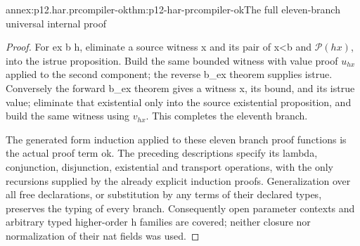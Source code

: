 \begin{annexitem}{annex:p12.har.prcompiler-ok}{thm:p12-har-prcompiler-ok}{The full eleven-branch universal internal proof}
\begin{proof}
For ex b h, eliminate a source witness x and its pair of x<b and
\(\mathcal P(h x)\), into the istrue proposition. Build the same
bounded witness with value proof \(u_{h x}\) applied to the second
component; the reverse b\_ex theorem supplies istrue. Conversely
the forward b\_ex theorem gives a witness x, its bound, and its
istrue value; eliminate that existential only into the source
existential proposition, and build the same witness using \(v_{h x}\).
This completes the eleventh branch.

The generated form induction applied to these eleven branch proof
functions is the actual proof term ok. The preceding descriptions
specify its lambda, conjunction, disjunction, existential and transport
operations, with the only recursions supplied by the already explicit
induction proofs. Generalization over all free declarations, or
substitution by any terms of their declared types, preserves the
typing of every branch. Consequently open parameter contexts and
arbitrary typed higher-order h families are covered; neither closure
nor normalization of their nat fields was used.
\end{proof}
\end{annexitem}


